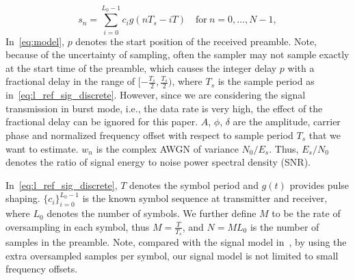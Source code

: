 \begin{equation}
    \label{eq:l_ref_sig_discrete}
    s_n=\sum_{i=0}^{L_0-1} c_i g(nT_s-iT) \quad \text{for}~n=0,\ldots,N-1, 
  \end{equation}
In~\eqref{eq:model}, $p$ denotes the start position of the received preamble.
Note, because of the uncertainty of sampling, often the sampler may not sample exactly at the start time of the preamble, which causes
the integer delay $p$ with a fractional delay in the range of $[-\frac{T_s}{2},\frac{T_s}{2})$, where $T_s$ is the sample period as in~\eqref{eq:l_ref_sig_discrete}.
However, since we are considering the signal transmission in burst mode, i.e., the data rate is very high, 
the effect of the fractional delay can be ignored for this paper. $A$, $\phi$, $\delta$ are the amplitude, carrier phase and 
normalized frequency offset with respect to sample period $T_s$ that we want to estimate.
$w_n$ is the complex AWGN of variance $N_0/E_s$. Thus, $E_s/N_0$ denotes the ratio of signal energy to noise power spectral density (SNR).

In~\eqref{eq:l_ref_sig_discrete}, $T$ denotes the symbol period and $g(t)$ provides pulse shaping.
$\{c_i\}_{i=0}^{L_0-1}$ is the known symbol sequence at transmitter and receiver, where $L_0$ denotes the number of symbols.
We further define $M$ to be the rate of oversampling in each symbol, thus $M=\frac{T}{T_s}$, and $N=ML_0$ is the number of samples in the preamble.
Note, compared with the signal model in~\cite{Morelli_Mengali_98,Fitz_91,Ramakrishnan_10}, by using the extra oversampled samples per symbol,
our signal model is not limited to small frequency offsets.



